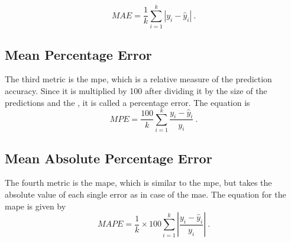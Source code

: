 \begin{equation}
MAE = \frac{1}{k} \sum_{i=1}^{k} \left|y_i-\hat{y}_i\right|~.
\end{equation}

\subsection*{Mean Percentage Error}

The third metric is the \gls{mpe}, which is a relative measure of the prediction accuracy. Since it is multiplied by 100 after dividing it by the size of the predictions and the , it is called a percentage error. The equation is\\

\begin{equation}
MPE = \frac{100}{k} \sum_{i=1}^{k} \frac{y_i-\hat{y}_i}{y_i}~.
\end{equation}

\subsection*{Mean Absolute Percentage Error}

The fourth metric is the \gls{mape}, which is similar to the \gls{mpe}, but takes the absolute value of each single error as in case of the \gls{mae}. The equation for the \gls{mape} is given by\\

\begin{equation}
MAPE = \frac{1}{k}\times 100 \sum_{i=1}^{k} \left|\frac{y_i-\hat{y}_i}{y_i}\right|~.
\label{eq:mape}
\end{equation}






%
%
%

